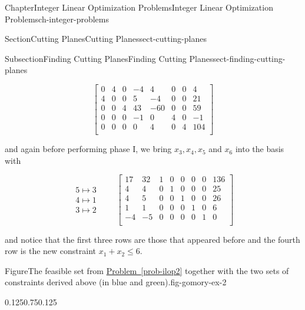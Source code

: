 \documentclass[oneside,10pt,]{book}
\newcommand{\xreffont}{\relax}
\numberwithin{equation}{section}
\newcommand{\amp}{&}
\begin{document}
\begin{chapterptx}{Chapter}{Integer Linear Optimization Problems}{}{Integer Linear Optimization Problems}{}{}{ch-integer-problems}
\begin{sectionptx}{Section}{Cutting Planes}{}{Cutting Planes}{}{}{sect-cutting-planes}
\begin{subsectionptx}{Subsection}{Finding Cutting Planes}{}{Finding Cutting Planes}{}{}{sect-finding-cutting-planes}
\par
%
\begin{equation}
\left[\begin{array}{rr|rrrrr|r} 0 \amp 4 \amp 0 \amp -4 \amp 4 \amp 0 \amp 0 \amp 4\\ 4 \amp 0 \amp 0 \amp 5 \amp -4 \amp 0 \amp 0 \amp 21\\ 0 \amp 0 \amp 4 \amp 43 \amp -60 \amp 0 \amp 0 \amp 59\\ 0 \amp 0 \amp 0 \amp -1 \amp 0 \amp 4 \amp 0 \amp -1\\ \hline 0 \amp 0 \amp 0 \amp 0 \amp 4 \amp 0 \amp 4 \amp 104\\ \end{array} \right]\label{eq-gomory-ex-3}
\end{equation}
%
\par
and again before performing phase I, we bring \(x_{3}, x_{4}, x_{5}\) and \(x_{6}\) into the basis with%
\par
%
\begin{equation*}
\begin{array}{r}5 \mapsto 3 \\ 4 \mapsto 1 \\ 3 \mapsto 2 \end{array} \qquad \left[\begin{array}{rr|rrrrr|r} 17 \amp 32 \amp 1 \amp 0 \amp 0 \amp 0 \amp 0 \amp 136\\ 4 \amp 4 \amp 0 \amp 1 \amp 0 \amp 0 \amp 0 \amp 25\\ 4 \amp 5 \amp 0 \amp 0 \amp 1 \amp 0 \amp 0 \amp 26\\ 1 \amp 1 \amp 0 \amp 0 \amp 0 \amp 1 \amp 0 \amp 6\\ \hline -4 \amp -5 \amp 0 \amp 0 \amp 0 \amp 0 \amp 1 \amp 0\\ \end{array} \right]
\end{equation*}
%
\par
and notice that the first three rows are those that appeared before and the fourth row is the new constraint \(x_1 + x_2 \leq 6\).%
\begin{figureptx}{Figure}{The feasible set from \hyperref[prob-ilop2]{Problem~{\xreffont\ref{prob-ilop2}}} together with the two sets of constraints derived above (in blue and green).}{fig-gomory-ex-2}{}%
\begin{image}{0.125}{0.75}{0.125}{}%
\end{image}
\end{figureptx}
\end{subsectionptx}
\end{sectionptx}
\end{chapterptx}
\end{document}
